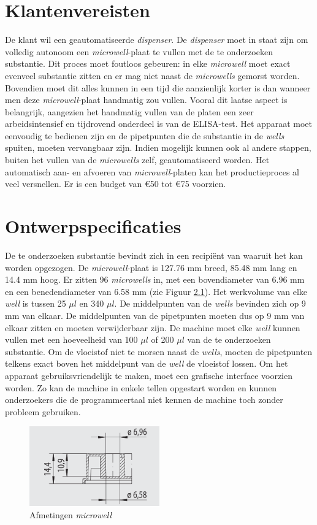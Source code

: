 \documentclass[a4paper,twoside,kulak]{kulakreport} %
\begin{document}
\chapter{Klantenvereisten}
De klant wil een geautomatiseerde \textit{dispenser}. De \textit{dispenser} moet in staat zijn om volledig autonoom een \textit{microwell}-plaat te vullen met de te onderzoeken substantie. Dit proces moet foutloos gebeuren: in elke \textit{microwell} moet exact evenveel substantie zitten en er mag niet naast de \textit{microwells} gemorst worden. Bovendien moet dit alles kunnen in een tijd die aanzienlijk korter is dan wanneer men deze \textit{microwell}-plaat handmatig zou vullen. Vooral dit laatse aspect is belangrijk, aangezien het handmatig vullen van de platen een zeer arbeidsintensief en tijdrovend onderdeel is van de ELISA-test. Het apparaat moet eenvoudig te bedienen zijn en de pipetpunten die de substantie in de \textit{wells} spuiten, moeten vervangbaar zijn.  Indien mogelijk kunnen ook al andere stappen, buiten het vullen van de \textit{microwells} zelf, geautomatiseerd worden. Het automatisch aan- en afvoeren van \textit{microwell}-platen kan het productieproces al veel versnellen. Er is een budget van \euro 50 tot \euro 75 voorzien.
\chapter{Ontwerpspecificaties}
De te onderzoeken substantie bevindt zich in een recipiënt van waaruit het kan worden opgezogen. De \textit{microwell}-plaat is 127.76 mm breed, 85.48 mm lang en 14.4 mm hoog. Er zitten 96 \textit{microwells} in, met een bovendiameter van 6.96 mm en een benedendiameter van 6.58 mm (zie Figuur \ref{fig: afmetingenMicrowellplaat}). Het werkvolume van elke \textit{well} is tussen 25 $\mu l$ en 340 $\mu l$. De middelpunten van de \textit{wells} bevinden zich op 9 mm van elkaar. De middelpunten van de pipetpunten moeten dus op 9 mm van elkaar zitten en moeten verwijderbaar zijn. De machine moet elke \textit{well} kunnen vullen met een hoeveelheid van 100 $\mu l$ of 200 $\mu l$ van de te onderzoeken substantie. Om de vloeistof niet te morsen naast de \textit{wells}, moeten de pipetpunten telkens exact boven het middelpunt van de \textit{well} de vloeistof lossen. Om het apparaat gebruiksvriendelijk te maken, moet een grafische interface voorzien worden. Zo kan de machine in enkele tellen opgestart worden en kunnen onderzoekers die de programmeertaal niet kennen de machine toch zonder probleem gebruiken.

\begin{figure}[h]
	\centering
	\includegraphics[width=0.5\textwidth]{AfmetingenMicrowell.png}
	\caption{Afmetingen \textit{microwell}}
	\label{fig: afmetingenMicrowellplaat}
	
\end{figure} 
\end{document}
